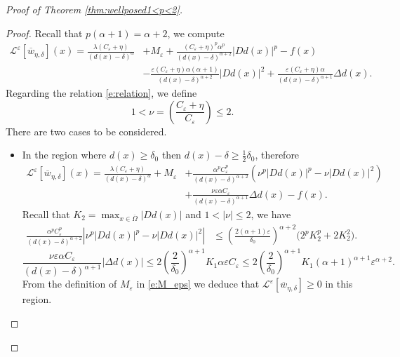 \documentclass[11pt,reqno]{amsart}
\numberwithin{figure}{section}
\theoremstyle{plain}
\theoremstyle{remark}
\numberwithin{equation}{section}
\begin{document}
\begin{appendices}
\begin{proof} [Proof of Theorem \ref{thm:wellposed1<p<2}]
\begin{proof} Recall that $p(\alpha+1) = \alpha+2$, we compute
\begin{align*}
    \mathcal{L}^\varepsilon\left[\overline{w}_{\eta,\delta}\right](x) = \frac{\lambda(C_\varepsilon + \eta)}{(d(x)-\delta)^\alpha} &+ M_\varepsilon + \frac{(C_\varepsilon+\eta)^p \alpha^p}{(d(x)-\delta)^{\alpha+2}}|D d(x)|^p - f(x) \\
    &- \frac{\varepsilon(C_\varepsilon+\eta)\alpha(\alpha+1)}{(d(x)-\delta)^{\alpha+2}}|D d(x)|^2 + \frac{\varepsilon(C_\varepsilon+\eta)\alpha}{(d(x)-\delta)^{\alpha+1}}\Delta d(x).
\end{align*}
Regarding the relation \eqref{e:relation}, we define
\begin{equation*}
    1<\nu = \left(\frac{C_\varepsilon+\eta}{C_\varepsilon}\right) \leq 2.
\end{equation*}
There are two cases to be considered.
\begin{itemize}
    \item In the region where $d(x)\geq \delta_0$ then $d(x)-\delta \geq \frac{1}{2}\delta_0$, therefore 
    \begin{align*}
        \mathcal{L}^\varepsilon\left[\overline{w}_{\eta,\delta}\right](x) = \frac{\lambda(C_\varepsilon + \eta)}{(d(x)-\delta)^\alpha} + M_\varepsilon &+ \frac{\alpha^pC_\varepsilon^p}{(d(x)-\delta)^{\alpha+2}}\left(\nu^{p}|Dd(x)|^p - \nu|Dd(x)|^2\right)\\
        &+\frac{\nu\varepsilon \alpha C_\varepsilon}{(d(x)-\delta)^{\alpha+1}}\Delta d(x) - f(x).
    \end{align*}
Recall that $K_2 = \max_{x\in\overline{\Omega}}|Dd(x)|$ and $1<|\nu|\leq 2$, we have
\begin{align*}
    \frac{\alpha^pC_\varepsilon^p}{(d(x)-\delta)^{\alpha+2}}\left|\nu^{p}|Dd(x)|^p - \nu|Dd(x)|^2\right| &\leq \left(\frac{2(\alpha+1)\varepsilon}{\delta_0}\right)^{\alpha+2}\big(2^pK_2^p+2K_2^2\big).
\end{align*}
\begin{equation*}
    \frac{\nu\varepsilon \alpha C_\varepsilon}{(d(x)-\delta)^{\alpha+1}}|\Delta d(x)| \leq 2\left(\frac{2}{\delta_0}\right)^{\alpha+1}K_1 \alpha\varepsilon C_\varepsilon \leq 2\left(\frac{2}{\delta_0}\right)^{\alpha+1}K_1 (\alpha+1)^{\alpha+1}\varepsilon^{\alpha+2}.
\end{equation*}
 From the definition of $M_\varepsilon$ in \eqref{e:M_eps} we deduce that $\mathcal{L}^\varepsilon\left[\overline{w}_{\eta,\delta}\right]\geq 0$ in this region.

\end{itemize}
\end{proof}
\end{proof}
\end{appendices}
\end{document}

